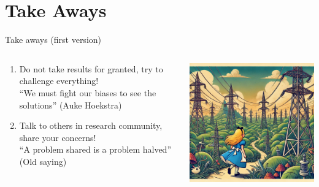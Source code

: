 \section{Take Aways}
\begin{frame}{Take aways (first version)}

\begin{columns}
\begin{column}{7cm}
  \begin{enumerate}
    \item Do not take results for granted, try to challenge everything! \\
    \enquote{We must fight our biases to see the solutions} (Auke Hoekstra)
    \item Talk to others in research community, share your concerns! \\
    \enquote{A problem shared is a problem halved} (Old saying)
  \end{enumerate}
\end{column}
\begin{column}{8cm}
  \includegraphics[width=8cm]{images/alice.png}
\end{column}
\end{columns}


\end{frame}


